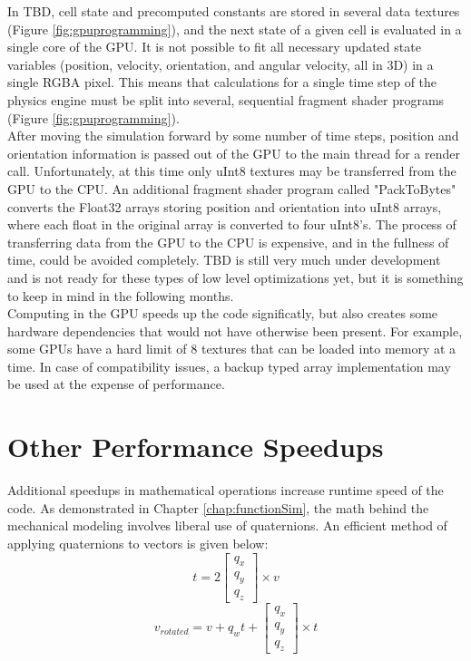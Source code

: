 {In TBD, cell state and precomputed constants are stored in several data textures (Figure \ref{fig:gpuprogramming}), and the next state of a given cell is evaluated in a single core of the GPU.  It is not possible to fit all necessary updated state variables (position, velocity, orientation, and angular velocity, all in 3D) in a single RGBA pixel.  This means that calculations for a single time step of the physics engine must be split into several, sequential fragment shader programs (Figure \ref{fig:gpuprogramming}).\\

After moving the simulation forward by some number of time steps, position and orientation information is passed out of the GPU to the main thread for a render call.  Unfortunately, at this time only uInt8 textures may be transferred from the GPU to the CPU.  An additional fragment shader program called "PackToBytes" converts the Float32 arrays storing position and orientation into uInt8 arrays, where each float in the original array is converted to four uInt8's.  The process of transferring data from the GPU to the CPU is expensive, and in the fullness of time, could be avoided completely.  TBD is still very much under development and is not ready for these types of low level optimizations yet, but it is something to keep in mind in the following months.\\

Computing in the GPU speeds up the code significatly, but also creates some hardware dependencies that would not have otherwise been present.  For example, some GPUs have a hard limit of 8 textures that can be loaded into memory at a time.  In case of compatibility issues, a backup typed array implementation may be used at the expense of performance.

\section{Other Performance Speedups}

Additional speedups in mathematical operations increase runtime speed of the code.  As demonstrated in Chapter \ref{chap:functionSim}, the math behind the mechanical modeling involves liberal use of quaternions.  An efficient method of applying quaternions to vectors is given below:
\[ t = 2 \left[ \begin{array}{ccc}
q_x\\
q_y\\
q_z
 \end{array} \right] \times v\]
\[ v_{rotated} = v + q_wt +  \left[ \begin{array}{ccc}
q_x\\
q_y\\
q_z
 \end{array} \right] \times t\]
 
}
